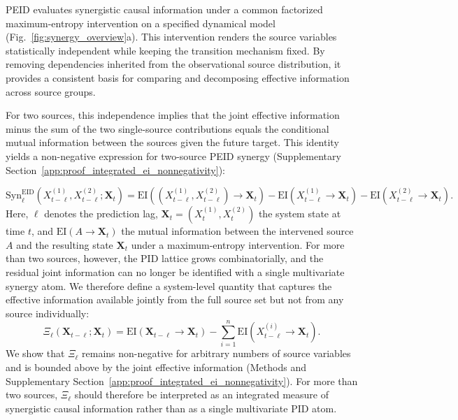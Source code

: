 \documentclass[fleqn,10pt]{wlscirep}
\theoremstyle{naturetheorem}
\begin{document}
PEID evaluates synergistic causal information under a common factorized maximum-entropy intervention on a specified dynamical model (Fig.~\ref{fig:synergy_overview}a). This intervention renders the source variables statistically independent while keeping the transition mechanism fixed. By removing dependencies inherited from the observational source distribution, it provides a consistent basis for comparing and decomposing effective information across source groups.

For two sources, this independence implies that the joint effective information minus the sum of the two single-source contributions equals the conditional mutual information between the sources given the future target. This identity yields a non-negative expression for two-source PEID synergy (Supplementary Section~\ref{app:proof_integrated_ei_nonnegativity}):

\begin{equation}
\mathrm{Syn}_{\ell}^{\mathrm{EID}}
\!\left(
X_{t-\ell}^{(1)},X_{t-\ell}^{(2)};\mathbf{X}_t
\right)
=
\mathrm{EI}\!\left(
(X_{t-\ell}^{(1)},X_{t-\ell}^{(2)})
\to\mathbf{X}_t
\right)
-
\mathrm{EI}\!\left(
X_{t-\ell}^{(1)}\to\mathbf{X}_t
\right)
-
\mathrm{EI}\!\left(
X_{t-\ell}^{(2)}\to\mathbf{X}_t
\right).
\end{equation}
Here, \(\ell\) denotes the prediction lag, \(\mathbf{X}_t=(X_t^{(1)},X_t^{(2)})\) the system state at time \(t\), and \(\mathrm{EI}(A\to\mathbf{X}_t)\) the mutual information between the intervened source \(A\) and the resulting state \(\mathbf{X}_t\) under a maximum-entropy intervention. For more than two sources, however, the PID lattice grows combinatorially, and the residual joint information can no longer be identified with a single multivariate synergy atom. We therefore define a system-level quantity that captures the effective information available jointly from the full source set but not from any source individually:
\begin{equation}
\Xi_{\ell}(\mathbf{X}_{t-\ell};\mathbf{X}_t)
=
\mathrm{EI}(\mathbf{X}_{t-\ell}\rightarrow\mathbf{X}_t)
-\sum_{i=1}^{n}
\mathrm{EI}\left(
X_{t-\ell}^{(i)}\rightarrow\mathbf{X}_t
\right).
\end{equation}
We show that \(\Xi_{\ell}\) remains non-negative for arbitrary numbers of source variables and is bounded above by the joint effective information (Methods and Supplementary Section~\ref{app:proof_integrated_ei_nonnegativity}). For more than two sources, \(\Xi_{\ell}\) should therefore be interpreted as an integrated measure of synergistic causal information rather than as a single multivariate PID atom.
\end{document}
